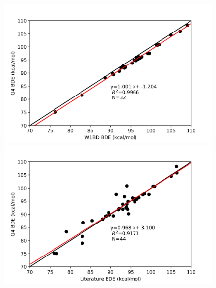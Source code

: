 \begin{figure}
\centering
\begin{minipage}{8cm}
  \centering
  \includegraphics[width=\textwidth]{figures/w1bd-g4}
\end{minipage}%
\begin{minipage}{8cm}
  \centering
  \includegraphics[width=\textwidth]{figures/lit-g4}
\end{minipage}
\end{figure}

